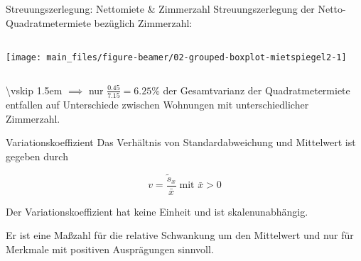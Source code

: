 \documentclass[
  10pt,
  ignorenonframetext,
]{beamer}
\begin{document}
\begin{frame}{Streuungszerlegung: Nettomiete \& Zimmerzahl}
\label{streuungszerlegung-nettomiete-zimmerzahl}
Streuungszerlegung der Netto-Quadratmetermiete bezüglich Zimmerzahl:

\begin{columns}
\begin{column}{0.55\textwidth}
\scriptsize

\begin{center}\texttt{[image: main\_files/figure-beamer/02-grouped-boxplot-mietspiegel2-1]} \end{center}

\normalsize
\end{column}
\end{columns}

\textbackslash vskip 1.5em \(\implies\) nur
\(\tfrac{0.45}{7.15} = 6.25\)\% der Gesamtvarianz der Quadratmetermiete
entfallen auf Unterschiede zwischen Wohnungen mit unterschiedlicher
Zimmerzahl.
\end{frame}

\begin{frame}{Variationskoeffizient}
\label{variationskoeffizient}
Das Verhältnis von Standardabweichung und Mittelwert ist gegeben durch

\begin{equation*}
  v = \frac{\widetilde s_x}{\bar x} \; \text{mit } \bar x > 0
\end{equation*}

Der Variationskoeffizient hat keine Einheit und ist skalenunabhängig.

Er ist eine Maßzahl für die relative Schwankung um den Mittelwert und
nur für Merkmale mit positiven Ausprägungen sinnvoll.
\end{frame}
\end{document}
